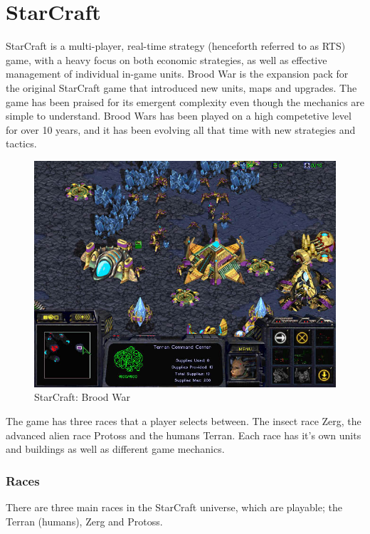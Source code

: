 
\section{StarCraft}
\label{sec:starcrafttheory}



StarCraft is a multi-player, real-time strategy (henceforth referred to as RTS) game, with a heavy focus on both economic strategies, as well as effective management of individual in-game units. Brood War is the expansion pack for the original StarCraft game that introduced new units, maps and upgrades. The game has been praised for its emergent complexity even though the mechanics are simple to understand. Brood Wars has been played on a high competetive level for over 10 years, and it has been evolving all that time with new strategies and tactics.

\begin{figure}[h!tb]
\centering
\includegraphics[scale=0.5]{graphics/scbw.jpg}
\caption{StarCraft: Brood War}
\label{fig:scbwIntro}
\end{figure}	

The game has three races that a player selects between. The insect race Zerg, the advanced alien race Protoss and the humans Terran. Each race has it's own units and buildings as well as different game mechanics. 

\subsubsection{Races}
There are three main races in the StarCraft universe, which are playable; the Terran (humans), Zerg and Protoss.

